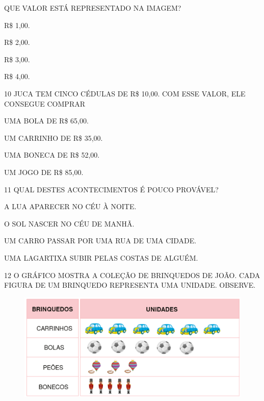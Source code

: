 QUE VALOR ESTÁ REPRESENTADO NA IMAGEM?

\begin{multicols}{2}
\begin{escolha}
\item R\$ 1,00.

\item R\$ 2,00.

\item R\$ 3,00.

\item R\$ 4,00.
\end{escolha}
\end{multicols}

\num{10} JUCA TEM CINCO CÉDULAS DE R\$ 10,00. COM ESSE VALOR, ELE CONSEGUE COMPRAR

\begin{multicols}{2}
\begin{escolha}[itemsep=0pt]
\item UMA BOLA DE R\$ 65,00.

\item UM CARRINHO DE R\$ 35,00.

\item UMA BONECA DE R\$ 52,00.

\item UM JOGO DE R\$ 85,00.
\end{escolha}
\end{multicols}

\num{11} QUAL DESTES ACONTECIMENTOS É POUCO PROVÁVEL?

\begin{escolha}[itemsep=0pt]
\item A LUA APARECER NO CÉU À NOITE.

\item O SOL NASCER NO CÉU DE MANHÃ.

\item UM CARRO PASSAR POR UMA RUA DE UMA CIDADE.

\item UMA LAGARTIXA SUBIR PELAS COSTAS DE ALGUÉM.
\end{escolha}

\num{12} O GRÁFICO MOSTRA A COLEÇÃO DE BRINQUEDOS DE JOÃO. CADA FIGURA DE UM
BRINQUEDO REPRESENTA UMA UNIDADE. OBSERVE.

\begin{figure}[H]
\includegraphics[width=\textwidth]{./media/SAEB_1ANO_MAT_FIGURA126.png}
\end{figure}

